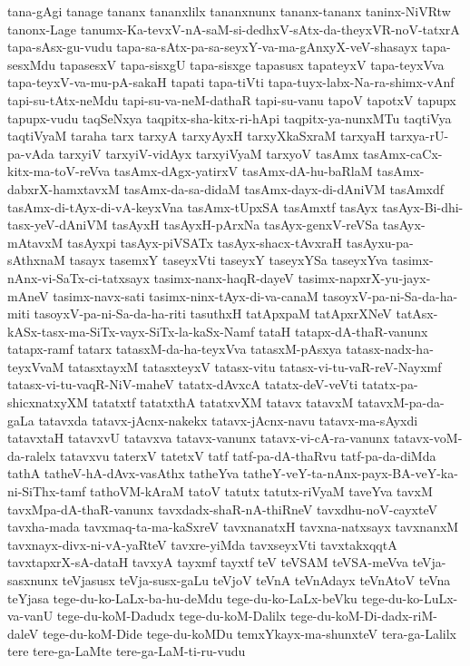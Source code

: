 {tana-gAgi
tanage
tananx
tananxlilx
tananxnunx
tananx-tananx
taninx-NiVRtw
tanonx-Lage
tanumx-Ka-tevxV-nA-saM-si-dedhxV-sAtx-da-theyxVR-noV-tatxrA
tapa-sAsx-gu-vudu
tapa-sa-sAtx-pa-sa-seyxY-va-ma-gAnxyX-veV-shasayx
tapa-sesxMdu
tapasesxV
tapa-sisxgU
tapa-sisxge
tapasusx
tapateyxV
tapa-teyxVva
tapa-teyxV-va-mu-pA-sakaH
tapati
tapa-tiVti
tapa-tuyx-labx-Na-ra-shimx-vAnf
tapi-su-tAtx-neMdu
tapi-su-va-neM-dathaR
tapi-su-vanu
tapoV
tapotxV
tapupx
tapupx-vudu
taqSeNxya
taqpitx-sha-kitx-ri-hApi
taqpitx-ya-nunxMTu
taqtiVya
taqtiVyaM
taraha
tarx
tarxyA
tarxyAyxH
tarxyXkaSxraM
tarxyaH
tarxya-rU-pa-vAda
tarxyiV
tarxyiV-vidAyx
tarxyiVyaM
tarxyoV
tasAmx
tasAmx-caCx-kitx-ma-toV-reVva
tasAmx-dAgx-yatirxV
tasAmx-dA-hu-baRlaM
tasAmx-dabxrX-hamxtavxM
tasAmx-da-sa-didaM
tasAmx-dayx-di-dAniVM
tasAmxdf
tasAmx-di-tAyx-di-vA-keyxVna
tasAmx-tUpxSA
tasAmxtf
tasAyx
tasAyx-Bi-dhi-tasx-yeV-dAniVM
tasAyxH
tasAyxH-pArxNa
tasAyx-genxV-reVSa
tasAyx-mAtavxM
tasAyxpi
tasAyx-piVSATx
tasAyx-shacx-tAvxraH
tasAyxu-pa-sAthxnaM
tasayx
tasemxY
taseyxVti
taseyxY
taseyxYSa
taseyxYva
tasimx-nAnx-vi-SaTx-ci-tatxsayx
tasimx-nanx-haqR-dayeV
tasimx-napxrX-yu-jayx-mAneV
tasimx-navx-sati
tasimx-ninx-tAyx-di-va-canaM
tasoyxV-pa-ni-Sa-da-ha-miti
tasoyxV-pa-ni-Sa-da-ha-riti
tasuthxH
tatApxpaM
tatApxrXNeV
tatAsx-kASx-tasx-ma-SiTx-vayx-SiTx-la-kaSx-Namf
tataH
tatapx-dA-thaR-vanunx
tatapx-ramf
tatarx
tatasxM-da-ha-teyxVva
tatasxM-pAsxya
tatasx-nadx-ha-teyxVvaM
tatasxtayxM
tatasxteyxV
tatasx-vitu
tatasx-vi-tu-vaR-reV-Nayxmf
tatasx-vi-tu-vaqR-NiV-maheV
tatatx-dAvxcA
tatatx-deV-veVti
tatatx-pa-shicxnatxyXM
tatatxtf
tatatxthA
tatatxvXM
tatavx
tatavxM
tatavxM-pa-da-gaLa
tatavxda
tatavx-jAcnx-nakekx
tatavx-jAcnx-navu
tatavx-ma-sAyxdi
tatavxtaH
tatavxvU
tatavxva
tatavx-vanunx
tatavx-vi-cA-ra-vanunx
tatavx-voM-da-ralelx
tatavxvu
taterxV
tatetxV
tatf
tatf-pa-dA-thaRvu
tatf-pa-da-diMda
tathA
tatheV-hA-dAvx-vasAthx
tatheYva
tatheY-veY-ta-nAnx-payx-BA-veY-ka-ni-SiThx-tamf
tathoVM-kAraM
tatoV
tatutx
tatutx-riVyaM
taveYva
tavxM
tavxMpa-dA-thaR-vanunx
tavxdadx-shaR-nA-thiRneV
tavxdhu-noV-cayxteV
tavxha-mada
tavxmaq-ta-ma-kaSxreV
tavxnanatxH
tavxna-natxsayx
tavxnanxM
tavxnayx-divx-ni-vA-yaRteV
tavxre-yiMda
tavxseyxVti
tavxtakxqqtA
tavxtapxrX-sA-dataH
tavxyA
tayxmf
tayxtf
teV
teVSAM
teVSA-meVva
teVja-sasxnunx
teVjasusx
teVja-susx-gaLu
teVjoV
teVnA
teVnAdayx
teVnAtoV
teVna
teYjasa
tege-du-ko-LaLx-ba-hu-deMdu
tege-du-ko-LaLx-beVku
tege-du-ko-LuLx-va-vanU
tege-du-koM-Dadudx
tege-du-koM-Dalilx
tege-du-koM-Di-dadx-riM-daleV
tege-du-koM-Dide
tege-du-koMDu
temxYkayx-ma-shunxteV
tera-ga-Lalilx
tere
tere-ga-LaMte
tere-ga-LaM-ti-ru-vudu
}
